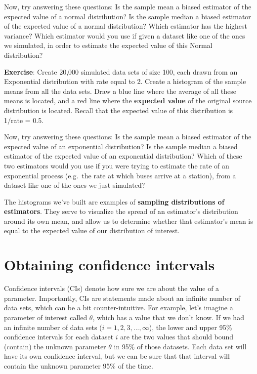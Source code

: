 \documentclass[
]{book}
\begin{document}
Now, try answering these questions: Is the sample mean a biased estimator of the expected value of a normal distribution? Is the sample median a biased estimator of the expected value of a normal distribution? Which estimator has the highest variance? Which estimator would you use if given a dataset like one of the ones we simulated, in order to estimate the expected value of this Normal distribution?

\textbf{Exercise}: Create 20,000 simulated data sets of size 100, each drawn from an Exponential distribution with rate equal to 2. Create a histogram of the sample means from all the data sets. Draw a blue line where the average of all these means is located, and a red line where the \textbf{expected value} of the original source distribution is located. Recall that the expected value of this distribution is 1/rate = 0.5.

Now, try answering these questions: Is the sample mean a biased estimator of the expected value of an exponential distribution? Is the sample median a biased estimator of the expected value of an exponential distribution? Which of these two estimators would you use if you were trying to estimate the rate of an exponential process (e.g.~the rate at which buses arrive at a station), from a dataset like one of the ones we just simulated?

The histograms we've built are examples of \textbf{sampling distributions of estimators}. They serve to visualize the spread of an estimator's distribution around its own mean, and allow us to determine whether that estimator's mean is equal to the expected value of our distribution of interest.

\hypertarget{obtaining-confidence-intervals}{%
\section{Obtaining confidence intervals}\label{obtaining-confidence-intervals}}

Confidence intervals (CIs) denote how sure we are about the value of a parameter. Importantly, CIs are statements made about an infinite number of data sets, which can be a bit counter-intuitive. For example, let's imagine a parameter of interest called \(\theta\), which has a value that we don't know. If we had an infinite number of data sets (\(i=1,2,3,...,\infty\)), the lower and upper 95\% confidence intervals for each dataset \(i\) are the two values that should bound (contain) the unknown parameter \(\theta\) in 95\% of those datasets. Each data set will have its own confidence interval, but we can be sure that that interval will contain the unknown parameter 95\% of the time.
\end{document}
